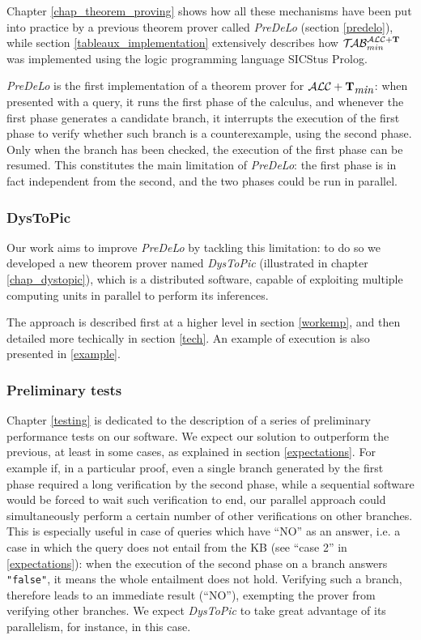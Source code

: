 \documentclass[a4paper, 11pt, oneside]{duthesis}
\newcommand{\tip}{{\bf T}}
\newcommand{\alctmin}{\mathcal{ALC}+\tip_{\mbox{\em min}}}
\newcommand{\nuovoc}{\mathrel{{\mathcal{T}\!\mathcal{AB}}}_{min}^{\mathcal{ALC}+\mbox{\scriptsize $\tip$}}}
\begin{document}
Chapter \ref{chap_theorem_proving} shows how all these mechanisms have been put into practice by a previous theorem prover called \emph{PreDeLo} (section \ref{predelo}), while section \ref{tableaux_implementation} extensively describes how $\nuovoc$ was implemented using the logic programming language SICStus Prolog.

\emph{PreDeLo} is the first implementation of a theorem prover for $\alctmin$: when presented with a query, it runs the first phase of the calculus, and whenever the first phase generates a candidate branch, it interrupts the execution of the first phase to verify whether such branch is a counterexample, using the second phase. Only when the branch has been checked, the execution of the first phase can be resumed. This constitutes the main limitation of \emph{PreDeLo}: the first phase is in fact independent from the second, and the two phases could be run in parallel.

\subsubsection{DysToPic}

Our work aims to improve \emph{PreDeLo} by tackling this limitation: to do so we developed a new theorem prover named \emph{DysToPic} (illustrated in chapter \ref{chap_dystopic}), which is a distributed software, capable of exploiting multiple computing units in parallel to perform its inferences.

The approach is described first at a higher level in section \ref{workemp}, and then detailed more techically  in section \ref{tech}. An example of execution is also presented in \ref{example}.

\newpage

\subsubsection{Preliminary tests}

Chapter \ref{testing} is dedicated to the description of a series of preliminary performance tests on our software.
We expect our solution to outperform the previous, at least in some cases, as explained in section \ref{expectations}. For example if, in a particular proof, even a single branch generated by the first phase required a long verification by the second phase, while a sequential software would be forced to wait such verification to end, our parallel approach could simultaneously perform a certain number of other verifications on other branches. This is especially useful in case of queries which have ``NO'' as an answer, i.e. a case in which the query does not entail from the KB (see ``case 2'' in \ref{expectations}): when the execution of the second phase on a branch answers \texttt{"false"}, it means the whole entailment does not hold. Verifying such a branch, therefore leads to an immediate result (``NO''), exempting the prover from verifying other branches. We expect \emph{DysToPic} to take great advantage of its parallelism, for instance, in this case.
\end{document}
